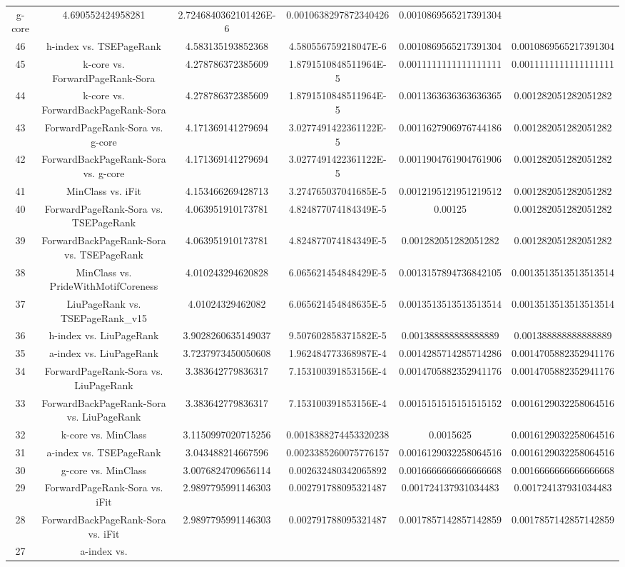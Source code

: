 \documentclass[a4paper,10pt]{article}
\begin{document}
\begin{landscape}
\begin{table}[!htp]
\begin{tabular}{cccccc}
g-core&4.690552424958281&2.7246840362101426E-6&0.0010638297872340426&0.0010869565217391304\\46&h-index vs. TSEPageRank&4.583135193852368&4.580556759218047E-6&0.0010869565217391304&0.0010869565217391304\\45&k-core vs. ForwardPageRank-Sora&4.278786372385609&1.8791510848511964E-5&0.0011111111111111111&0.0011111111111111111\\44&k-core vs. ForwardBackPageRank-Sora&4.278786372385609&1.8791510848511964E-5&0.0011363636363636365&0.001282051282051282\\43&ForwardPageRank-Sora vs. g-core&4.171369141279694&3.0277491422361122E-5&0.0011627906976744186&0.001282051282051282\\42&ForwardBackPageRank-Sora vs. g-core&4.171369141279694&3.0277491422361122E-5&0.0011904761904761906&0.001282051282051282\\41&MinClass vs. iFit&4.153466269428713&3.274765037041685E-5&0.0012195121951219512&0.001282051282051282\\40&ForwardPageRank-Sora vs. TSEPageRank&4.063951910173781&4.824877074184349E-5&0.00125&0.001282051282051282\\39&ForwardBackPageRank-Sora vs. TSEPageRank&4.063951910173781&4.824877074184349E-5&0.001282051282051282&0.001282051282051282\\38&MinClass vs. PrideWithMotifCoreness&4.010243294620828&6.065621454848429E-5&0.0013157894736842105&0.0013513513513513514\\37&LiuPageRank vs. TSEPageRank_v15&4.01024329462082&6.065621454848635E-5&0.0013513513513513514&0.0013513513513513514\\36&h-index vs. LiuPageRank&3.9028260635149037&9.507602858371582E-5&0.001388888888888889&0.001388888888888889\\35&a-index vs. LiuPageRank&3.7237973450050608&1.962484773368987E-4&0.0014285714285714286&0.0014705882352941176\\34&ForwardPageRank-Sora vs. LiuPageRank&3.383642779836317&7.153100391853156E-4&0.0014705882352941176&0.0014705882352941176\\33&ForwardBackPageRank-Sora vs. LiuPageRank&3.383642779836317&7.153100391853156E-4&0.0015151515151515152&0.0016129032258064516\\32&k-core vs. MinClass&3.1150997020715256&0.0018388274453320238&0.0015625&0.0016129032258064516\\31&a-index vs. TSEPageRank&3.043488214667596&0.0023385260075776157&0.0016129032258064516&0.0016129032258064516\\30&g-core vs. MinClass&3.0076824709656114&0.002632480342065892&0.0016666666666666668&0.0016666666666666668\\29&ForwardPageRank-Sora vs. iFit&2.9897795991146303&0.002791788095321487&0.001724137931034483&0.001724137931034483\\28&ForwardBackPageRank-Sora vs. iFit&2.9897795991146303&0.002791788095321487&0.0017857142857142859&0.0017857142857142859\\27&a-index vs. 
\end{tabular}
\end{table}
\end{landscape}
\end{document}
